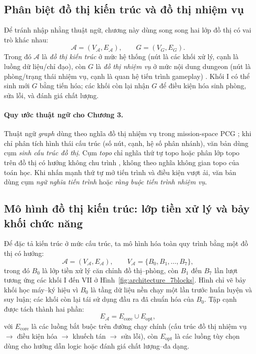\documentclass[oneside,a4paper,12pt]{extreport}
\begin{document}
\subsection{Phân biệt đồ thị kiến trúc và đồ thị nhiệm vụ}
Để tránh nhập nhằng thuật ngữ, chương này dùng song song hai lớp đồ thị có vai trò khác nhau:
\begin{equation}
\mathcal{A}=(V_{\mathcal{A}},E_{\mathcal{A}}),
\qquad
G=(V_G,E_G).
\end{equation}
Trong đó $\mathcal{A}$ là \emph{đồ thị kiến trúc} ở mức hệ thống (nút là các khối xử lý, cạnh là luồng dữ liệu/chỉ đạo), còn $G$ là \emph{đồ thị nhiệm vụ} ở mức nội dung dungeon (nút là phòng/trạng thái nhiệm vụ, cạnh là quan hệ tiến trình gameplay) \cite{dormans2011missionspaces}. Khối I có thể sinh mới $G$ bằng tiến hóa; các khối còn lại nhận $G$ để điều kiện hóa sinh phòng, sửa lỗi, và đánh giá chất lượng.

\paragraph{Quy ước thuật ngữ cho Chương 3.}
Thuật ngữ \emph{graph} dùng theo nghĩa đồ thị nhiệm vụ trong mission-space PCG \cite{dormans2011missionspaces,mota2021dungeon,togelius2011pcg}; khi chỉ phân tích hình thái cấu trúc (số nút, cạnh, hệ số phân nhánh), văn bản dùng cụm \emph{sinh cấu trúc đồ thị}. Cụm \emph{topo} chỉ nghĩa thứ tự topo hoặc phân lớp topo trên đồ thị có hướng không chu trình \cite{kahn1962topological}, không theo nghĩa không gian topo của toán học. Khi nhấn mạnh thứ tự mở tiến trình và điều kiện vượt ải, văn bản dùng cụm \emph{ngữ nghĩa tiến trình} hoặc \emph{ràng buộc tiến trình nhiệm vụ}.

\subsection{Mô hình đồ thị kiến trúc: lớp tiền xử lý và bảy khối chức năng}
Để đặc tả kiến trúc ở mức cấu trúc, ta mô hình hóa toàn quy trình bằng một đồ thị có hướng:
\begin{equation}
\mathcal{A}=(V_{\mathcal{A}},E_{\mathcal{A}}),
\qquad
V_{\mathcal{A}}=\{B_0,B_1,\ldots,B_7\},
\end{equation}
trong đó $B_0$ là lớp tiền xử lý căn chỉnh đồ thị--phòng, còn $B_1$ đến $B_7$ lần lượt tương ứng các khối I đến VII ở Hình~\ref{fig:architecture_7blocks}. Hình chỉ vẽ bảy khối học máy--ký hiệu vì $B_0$ là tầng dữ liệu nền chạy một lần trước huấn luyện và suy luận; các khối còn lại tái sử dụng đầu ra đã chuẩn hóa của $B_0$. Tập cạnh được tách thành hai phần:
\begin{equation}
E_{\mathcal{A}}=E_{\text{core}}\cup E_{\text{opt}},
\end{equation}
với $E_{\text{core}}$ là các luồng bắt buộc trên đường chạy chính (cấu trúc đồ thị nhiệm vụ $\rightarrow$ điều kiện hóa $\rightarrow$ khuếch tán $\rightarrow$ sửa lỗi), còn $E_{\text{opt}}$ là các luồng tùy chọn dùng cho hướng dẫn logic hoặc đánh giá chất lượng--đa dạng.
\end{document}
